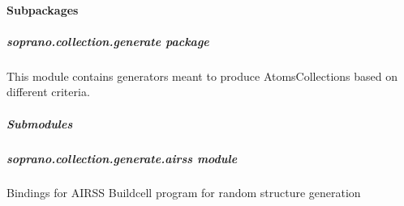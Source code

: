 \documentclass[letterpaper,10pt,english]{sphinxmanual}
\begin{document}
\paragraph{Subpackages}
\label{doctree/soprano.collection:subpackages}

\subparagraph{soprano.collection.generate package}
\label{doctree/soprano.collection.generate:module-soprano.collection.generate}\label{doctree/soprano.collection.generate:soprano-collection-generate-package}\label{doctree/soprano.collection.generate::doc}
This module contains generators meant to produce AtomsCollections based
on different criteria.


\subparagraph{Submodules}
\label{doctree/soprano.collection.generate:submodules}

\subparagraph{soprano.collection.generate.airss module}
\label{doctree/soprano.collection.generate.airss::doc}\label{doctree/soprano.collection.generate.airss:module-soprano.collection.generate.airss}\label{doctree/soprano.collection.generate.airss:soprano-collection-generate-airss-module}
Bindings for AIRSS Buildcell program for random structure generation
\end{document}
